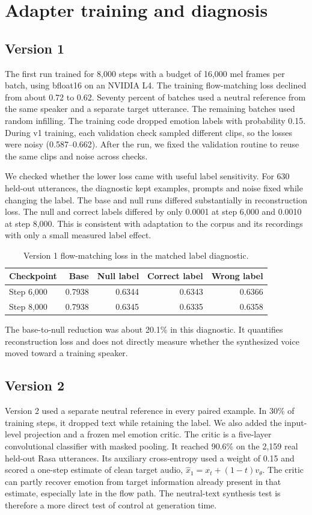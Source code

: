 \documentclass[11pt,a4paper]{article}
\newcommand{\sectionpage}[1]{\clearpage\section{#1}}
\begin{document}
\sectionpage{Adapter training and diagnosis}
\subsection{Version 1}
The first run trained for 8,000 steps with a budget of 16,000 mel frames per batch, using bfloat16 on an NVIDIA L4. The training flow-matching loss declined from about 0.72 to 0.62. Seventy percent of batches used a neutral reference from the same speaker and a separate target utterance. The remaining batches used random infilling. The training code dropped emotion labels with probability 0.15. During v1 training, each validation check sampled different clips, so the losses were noisy (0.587--0.662). After the run, we fixed the validation routine to reuse the same clips and noise across checks.

We checked whether the lower loss came with useful label sensitivity. For 630 held-out utterances, the diagnostic kept examples, prompts and noise fixed while changing the label. The base and null runs differed substantially in reconstruction loss. The null and correct labels differed by only 0.0001 at step 6,000 and 0.0010 at step 8,000. This is consistent with adaptation to the corpus and its recordings with only a small measured label effect.

\begin{table}[!h]
\centering
\caption{Version 1 flow-matching loss in the matched label diagnostic.}
\begin{tabular}{@{}lrrrr@{}}
\toprule
Checkpoint & Base & Null label & Correct label & Wrong label \\
\midrule
Step 6,000 & 0.7938 & 0.6344 & 0.6343 & 0.6366 \\
Step 8,000 & 0.7938 & 0.6345 & 0.6335 & 0.6358 \\
\bottomrule
\end{tabular}
\end{table}

The base-to-null reduction was about 20.1\% in this diagnostic. It quantifies reconstruction loss and does not directly measure whether the synthesized voice moved toward a training speaker.

\subsection{Version 2}
Version 2 used a separate neutral reference in every paired example. In 30\% of training steps, it dropped text while retaining the label. We also added the input-level projection and a frozen mel emotion critic. The critic is a five-layer convolutional classifier with masked pooling. It reached 90.6\% on the 2,159 real held-out Rasa utterances. Its auxiliary cross-entropy used a weight of 0.15 and scored a one-step estimate of clean target audio, \(\widehat{x}_1=x_t+(1-t)v_\theta\). The critic can partly recover emotion from target information already present in that estimate, especially late in the flow path. The neutral-text synthesis test is therefore a more direct test of control at generation time.
\end{document}
